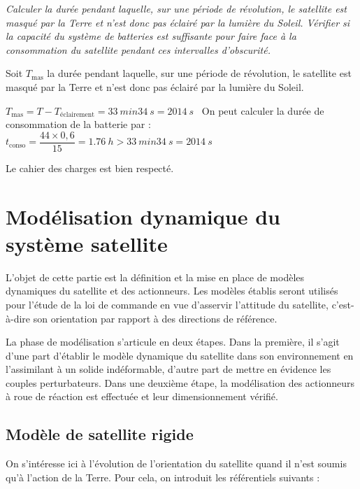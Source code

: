 \else
\fi

\question{\label{q_5}}\textit{Calculer la durée pendant laquelle, sur une période de révolution, le
  satellite est masqué par la Terre et n'est donc pas éclairé par la
  lumière du Soleil. Vérifier si la capacité du système de batteries est
  suffisante pour faire face à la consommation du satellite pendant ces
  intervalles d'obscurité.}
\ifprof
\begin{corrige}
Soit $T_{\text{mas}}$  la durée pendant laquelle, sur une période de révolution, le
  satellite est masqué par la Terre et n'est donc pas éclairé par la
  lumière du Soleil.
  
  $  T_{\text{mas}}=T-T_{\text{éclairement}}=\SI{33}{min}\SI{34}{s}=\SI{2014}{s}$
  \
  On peut calculer la durée de consommation de la batterie par  : 
  $  t_{\text{conso}}=\dfrac{44\times 0,6}{15}=\SI{1,76}{h}>\SI{33}{min}\SI{34}{s}=\SI{2014}{s}$
  
  Le cahier des charges est bien respecté.
\end{corrige}
\else
\fi


\section{Modélisation dynamique du système satellite}\label{partieII}

\begin{obj}
L'objet de cette partie est la définition et la mise en place de modèles
dynamiques du satellite et des actionneurs. Les modèles établis seront
utilisés pour l'étude de la loi de commande en vue d'asservir l'attitude
du satellite, c'est-à-dire son orientation par rapport à des directions
de référence.
\end{obj}

\ifprof
\else
La phase de modélisation s'articule en deux étapes. Dans la première, il
s'agit d'une part d'établir le modèle dynamique du satellite dans son
environnement en l'assimilant à un solide indéformable, d'autre part de
mettre en évidence les couples perturbateurs. Dans une deuxième étape,
la modélisation des actionneurs à roue de réaction est effectuée et leur
dimensionnement vérifié.
\fi

\subsection{Modèle de satellite rigide}
\ifprof
\else
On s'intéresse ici à l'évolution de l'orientation du satellite quand il
n'est soumis qu'à l'action de la Terre. Pour cela, on introduit les
référentiels suivants :

